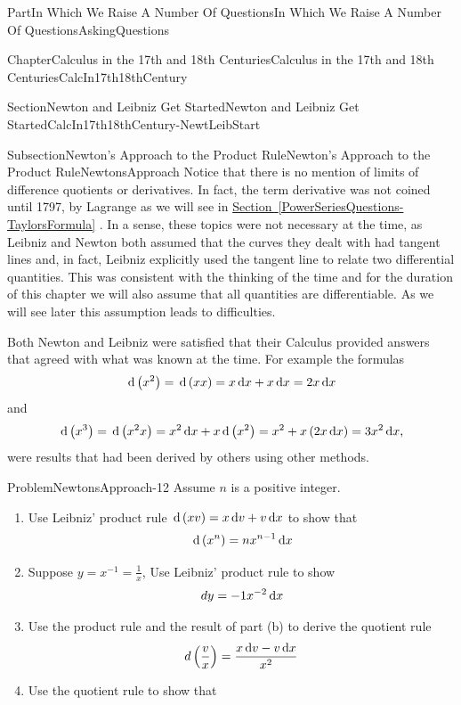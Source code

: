 \documentclass[oneside,10pt,]{book}
\newcommand{\xreffont}{\relax}
\numberwithin{equation}{part}
\newcommand{\dx}[1]{\,{\rm d}#1}
\begin{document}
\begin{partptx}{Part}{In Which We Raise A Number Of Questions}{}{In Which We Raise A Number Of Questions}{}{}{AskingQuestions}
\begin{chapterptx}{Chapter}{Calculus in the 17th and 18th Centuries}{}{Calculus in the 17th and 18th Centuries}{}{}{CalcIn17th18thCentury}
\begin{sectionptx}{Section}{Newton and Leibniz Get Started}{}{Newton and Leibniz Get Started}{}{}{CalcIn17th18thCentury-NewtLeibStart}
\begin{subsectionptx}{Subsection}{Newton's Approach to the Product Rule}{}{Newton's Approach to the Product Rule}{}{}{NewtonsApproach}
 Notice that there is no mention of limits of difference quotients or derivatives.  In fact, the term derivative was not coined until 1797, by Lagrange as we will see in \hyperref[PowerSeriesQuestions-TaylorsFormula]{Section~{\xreffont\ref{PowerSeriesQuestions-TaylorsFormula}}} .  In a sense, these topics were not necessary at the time, as Leibniz and Newton both assumed that the curves they dealt with had tangent lines and, in fact, Leibniz explicitly used the tangent line to relate two differential quantities.  This was consistent with the thinking of the time and for the duration of this chapter we will also assume that all quantities are differentiable.  As we will see later this assumption leads to difficulties.%
\par
Both Newton and Leibniz were satisfied that their Calculus provided answers that agreed with what was known at the time.  For example the formulas%
\begin{equation*}
\dx{ \left(x^2\right)}=\dx{\left(xx\right)}=x\dx{ x}+x\dx{
x}=2x\dx{ x} 
\end{equation*}
and%
\begin{equation*}
\dx{\left(x^3\right)}=\dx{\left(x^2x\right)}=x^2\dx{
x}+x\dx{\left(x^2\right)}=x^2+x\left(2x\dx{
x}\right)=3x^2\dx{ x}\text{,}
\end{equation*}
were results that had been derived by others using other methods.%
\begin{problem}{Problem}{}{NewtonsApproach-12}%
Assume \(n\) is a positive integer.%
\begin{enumerate}[font=\bfseries,label=(\alph*),ref=\alph*]%
\item{}Use Leibniz' product rule \(\dx{\left(xv\right)}=x\dx{v}+v\dx{x}\) to show that%
\begin{equation*}
\dx{\left(x^n\right)}=nx^{n-1}\dx{x}
\end{equation*}
%
\item{}Suppose \(y=x^{-1}=\frac{1}{x}\), Use Leibniz' product rule to show%
\begin{equation*}
dy=-1x^{-2}\dx{x}
\end{equation*}
%
\item{}Use the product rule and the result of part (b) to derive the quotient rule%
\begin{equation*}
d\left(\frac{v}{x}\right)=\frac{x\dx{v}-v\dx{x}}{x^2}
\end{equation*}
%
\item{}Use the quotient rule to show that%
\begin{equation*}

\end{equation*}
\end{enumerate}
\end{problem}
\end{subsectionptx}
\end{sectionptx}
\end{chapterptx}
\end{partptx}
\end{document}
